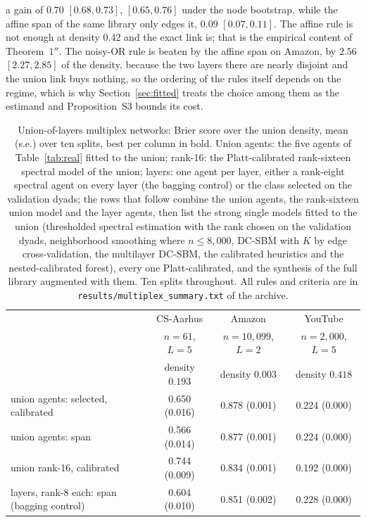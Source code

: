 \documentclass[12pt]{article}
\begin{document}
a gain of $0.70$ $[0.68,0.73]$, $[0.65,0.76]$ under the node bootstrap, while the affine span of the same library only edges it, $0.09$ $[0.07,0.11]$. The affine rule is not enough at density $0.42$ and the exact link is; that is the empirical content of Theorem~$1''$. The noisy-OR rule is beaten by the affine span on Amazon, by $2.56$ $[2.27,2.85]$ of the density, because the two layers there are nearly disjoint and the union link buys nothing, so the ordering of the rules itself depends on the regime, which is why Section~\ref{sec:fitted} treats the choice among them as the estimand and Proposition~S3 bounds its cost.

\begin{table}[htbp]
\centering
\caption{Union-of-layers multiplex networks: Brier score over the union density, mean (s.e.) over ten splits, best per column in bold. Union agents: the five agents of Table~\ref{tab:real} fitted to the union; rank-16: the Platt-calibrated rank-sixteen spectral model of the union; layers: one agent per layer, either a rank-eight spectral agent on every layer (the bagging control) or the class selected on the validation dyads; the rows that follow combine the union agents, the rank-sixteen union model and the layer agents, then list the strong single models fitted to the union (thresholded spectral estimation with the rank chosen on the validation dyads, neighborhood smoothing where $n\le8{,}000$, DC-SBM with $K$ by edge cross-validation, the multilayer DC-SBM, the calibrated heuristics and the nested-calibrated forest), every one Platt-calibrated, and the synthesis of the full library augmented with them. Ten splits throughout. All rules and criteria are in \texttt{results/multiplex\_summary.txt} of the archive.}
\label{tab:multiplex}
\footnotesize\setlength{\tabcolsep}{4pt}
\begin{tabular}{lccc}
\toprule
 & CS-Aarhus & Amazon & YouTube \\
 & $n=61$, $L=5$ & $n=10,099$, $L=2$ & $n=2,000$, $L=5$ \\
 & density $0.193$ & density $0.003$ & density $0.418$ \\
\midrule
union agents: selected, calibrated & 0.650 (0.016) & 0.878 (0.001) & 0.224 (0.000) \\
union agents: span & 0.566 (0.014) & 0.877 (0.001) & 0.224 (0.000) \\
union rank-16, calibrated & 0.744 (0.009) & 0.834 (0.001) & 0.192 (0.000) \\
layers, rank-8 each: span (bagging control) & 0.604 (0.010) & 0.851 (0.002) & 0.228 (0.000) \\

\end{tabular}
\end{table}
\end{document}
